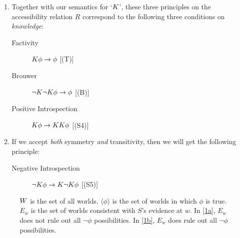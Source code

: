 \documentclass[landscape, two column, full page,reqno]{article}
\let\mathcal\relax
\newcommand{\mathcal}{\OMScal}%
\newcommand{\qe}{\begin{enumerate}}
\newcommand{\ze}{\end{enumerate}}
\newcommand{\p}{\item}
\newcommand{\e}{\emph}
\newcommand{\K}{\mathcal{K}}
\begin{document}
	\qe
	\p Together with our semantics for `$\K$', these three principles on the accessibility relation $R$ correspond to the following three conditions on \e{knowledge}:
	\begin{description}
	\p[Factivity] $\K \phi \to \phi$   \hfill [(T)]
	\p[Brouwer] $\neg \K \neg \K \phi \to \phi$ \hfill [(B)]
	\p[Positive Introspection] $\K \phi \to \K \K \phi$ \hfill [(S4)]
	\end{description}
	\p If we accept \e{both} symmetry \e{and} transitivity, then we will get the following principle:
	\begin{description}
	\p[Negative Introspection] $\neg \K \phi \to \K \neg \K \phi$ \hfill [(S5)]
	\end{description}
	\ze 
\begin{figure}
\centering
{}
\qquad
{}
\caption{$\mathcal{W}$ is the set of all worlds.  $\langle \phi \rangle$ is the set of worlds in which $\phi$ is true.  $E_w$ is the set of worlds consistent with $S$'s evidence at $w$.  In \ref{1a}, $E_w$ does not rule out all $\neg \phi$ possibilities.  In \ref{1b}, $E_w$ does rule out all $\neg \phi$ possibilities.\label{1}}
\end{figure}
\end{document}
